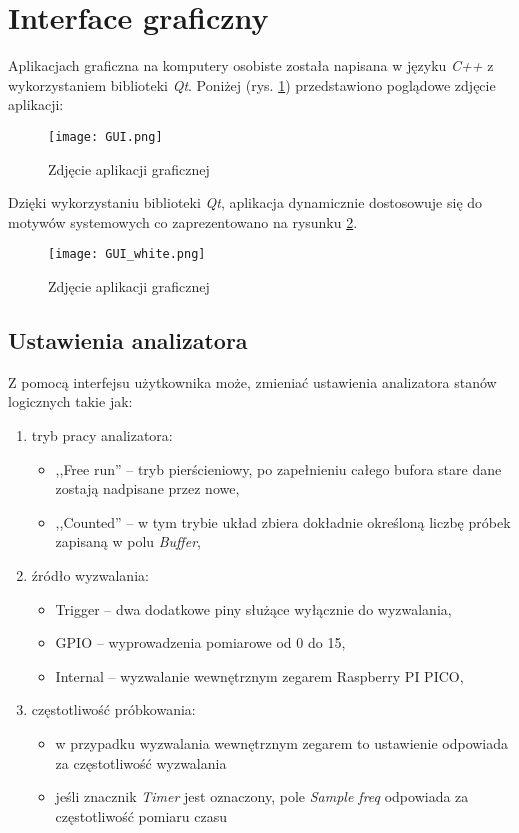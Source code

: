 \section{Interface graficzny}
    Aplikacjach graficzna na komputery osobiste została napisana w języku \textit{C++} z wykorzystaniem biblioteki \textit{Qt}.
    Poniżej (rys. \ref{fig:gui}) przedstawiono poglądowe zdjęcie aplikacji:

    \begin{figure}[!ht]
        \centering
        \texttt{[image: GUI.png]}
        \caption{Zdjęcie aplikacji graficznej}
        \label{fig:gui}
    \end{figure}

    Dzięki wykorzystaniu biblioteki \textit{Qt}, aplikacja dynamicznie dostosowuje się do motywów systemowych co zaprezentowano na rysunku \ref{fig:gui_white}.
    \begin{figure}[!ht]
        \centering
        \texttt{[image: GUI\_white.png]}
        \caption{Zdjęcie aplikacji graficznej}
        \label{fig:gui_white}
    \end{figure}


    \subsection{Ustawienia analizatora}
        Z pomocą interfejsu użytkownika może, zmieniać ustawienia analizatora stanów logicznych takie jak:
        \begin{enumerate}
            \item tryb pracy analizatora:
            \begin{itemize}
                \item ,,Free run'' -- tryb pierścieniowy, po zapełnieniu całego bufora stare dane zostają nadpisane przez nowe,
                \item ,,Counted''  -- w tym trybie układ zbiera dokładnie określoną liczbę próbek zapisaną w polu \textit{Buffer},
            \end{itemize}
            \item źródło wyzwalania:
            \begin{itemize}
                \item Trigger   -- dwa dodatkowe piny służące wyłącznie do wyzwalania,
                \item GPIO      -- wyprowadzenia pomiarowe od 0 do 15,
                \item Internal  -- wyzwalanie wewnętrznym zegarem Raspberry PI PICO,
            \end{itemize}
            \item częstotliwość próbkowania:
            \begin{itemize}
                \item w przypadku wyzwalania wewnętrznym zegarem to ustawienie odpowiada za częstotliwość wyzwalania
                \item jeśli znacznik \textit{Timer} jest oznaczony, pole \textit{Sample freq} odpowiada za częstotliwość pomiaru czasu
            \end{itemize}
        \end{enumerate}

